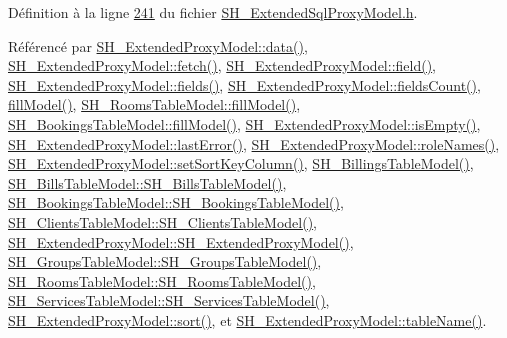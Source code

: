 Définition à la ligne \hyperlink{SH__ExtendedSqlProxyModel_8h_source_l00241}{241} du fichier \hyperlink{SH__ExtendedSqlProxyModel_8h_source}{S\-H\-\_\-\-Extended\-Sql\-Proxy\-Model.\-h}.



Référencé par \hyperlink{classSH__ExtendedProxyModel_afbc947efbe1107fc5bf8926c52902a1c}{S\-H\-\_\-\-Extended\-Proxy\-Model\-::data()}, \hyperlink{classSH__ExtendedProxyModel_a1df5323af8d29e81f22a7118227eeeb8}{S\-H\-\_\-\-Extended\-Proxy\-Model\-::fetch()}, \hyperlink{classSH__ExtendedProxyModel_a75081819198741a532eefd5875a90678}{S\-H\-\_\-\-Extended\-Proxy\-Model\-::field()}, \hyperlink{classSH__ExtendedProxyModel_a3a69386b6070dacf320ef29e760816c1}{S\-H\-\_\-\-Extended\-Proxy\-Model\-::fields()}, \hyperlink{classSH__ExtendedProxyModel_ab935cb0865fd2010ab35f1743adb8633}{S\-H\-\_\-\-Extended\-Proxy\-Model\-::fields\-Count()}, \hyperlink{classSH__BillingsTableModel_abb270d638314e98a5512c68c66bd88f1}{fill\-Model()}, \hyperlink{classSH__RoomsTableModel_a5ac9fe2af0bda8002387546a0db01e1d}{S\-H\-\_\-\-Rooms\-Table\-Model\-::fill\-Model()}, \hyperlink{classSH__BookingsTableModel_a03e7c5e25dd25bdb0c85c4465ddd95e5}{S\-H\-\_\-\-Bookings\-Table\-Model\-::fill\-Model()}, \hyperlink{classSH__ExtendedProxyModel_af8e37132288a46f527be0c67b652fdf5}{S\-H\-\_\-\-Extended\-Proxy\-Model\-::is\-Empty()}, \hyperlink{classSH__ExtendedProxyModel_afb11fa89e1181d88843ea0f7fb3fe654}{S\-H\-\_\-\-Extended\-Proxy\-Model\-::last\-Error()}, \hyperlink{classSH__ExtendedProxyModel_aead7c7969b112c3d0443051ae6a4757a}{S\-H\-\_\-\-Extended\-Proxy\-Model\-::role\-Names()}, \hyperlink{classSH__ExtendedProxyModel_ab8123244a5060aa35f5bce651046b99d}{S\-H\-\_\-\-Extended\-Proxy\-Model\-::set\-Sort\-Key\-Column()}, \hyperlink{classSH__BillingsTableModel_a96183b1dd581519136c9b3932607f3d0}{S\-H\-\_\-\-Billings\-Table\-Model()}, \hyperlink{classSH__BillsTableModel_ab93c4113bb4f81833f9a3b7d9365ed3f}{S\-H\-\_\-\-Bills\-Table\-Model\-::\-S\-H\-\_\-\-Bills\-Table\-Model()}, \hyperlink{classSH__BookingsTableModel_a870c87c10391ca25985f3b8ea04cbaa6}{S\-H\-\_\-\-Bookings\-Table\-Model\-::\-S\-H\-\_\-\-Bookings\-Table\-Model()}, \hyperlink{classSH__ClientsTableModel_ac0fce2c2880ff26de22fce2abb6432a3}{S\-H\-\_\-\-Clients\-Table\-Model\-::\-S\-H\-\_\-\-Clients\-Table\-Model()}, \hyperlink{classSH__ExtendedProxyModel_a63b0969a9f5799c9e871e6ceb13cf83e}{S\-H\-\_\-\-Extended\-Proxy\-Model\-::\-S\-H\-\_\-\-Extended\-Proxy\-Model()}, \hyperlink{classSH__GroupsTableModel_a038761e5d85ea2d06867f4b28ffc6677}{S\-H\-\_\-\-Groups\-Table\-Model\-::\-S\-H\-\_\-\-Groups\-Table\-Model()}, \hyperlink{classSH__RoomsTableModel_a722f2c372e27e502e73f045b38301368}{S\-H\-\_\-\-Rooms\-Table\-Model\-::\-S\-H\-\_\-\-Rooms\-Table\-Model()}, \hyperlink{classSH__ServicesTableModel_ab21926661cb9374e9116a3236800caa7}{S\-H\-\_\-\-Services\-Table\-Model\-::\-S\-H\-\_\-\-Services\-Table\-Model()}, \hyperlink{classSH__ExtendedProxyModel_a2d5fdb58bf67879e3f3130619b93104a}{S\-H\-\_\-\-Extended\-Proxy\-Model\-::sort()}, et \hyperlink{classSH__ExtendedProxyModel_abb133e196ca7cf90b9c9b57263e898d6}{S\-H\-\_\-\-Extended\-Proxy\-Model\-::table\-Name()}.



